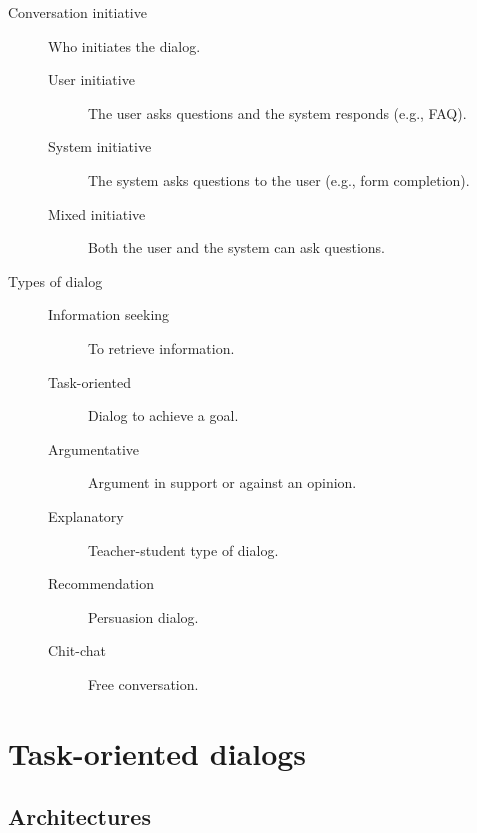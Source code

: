 \begin{description}
    \item[Conversation initiative] 
        Who initiates the dialog.

        \begin{description}
            \item[User initiative]
                The user asks questions and the system responds (e.g., FAQ).

            \item[System initiative]
                The system asks questions to the user (e.g., form completion).

            \item[Mixed initiative]
                Both the user and the system can ask questions.
        \end{description}

    \item[Types of dialog] 
        \phantom{}
        \begin{description}
            \item[Information seeking] To retrieve information.
            \item[Task-oriented] Dialog to achieve a goal.
            \item[Argumentative] Argument in support or against an opinion.
            \item[Explanatory] Teacher-student type of dialog. 
            \item[Recommendation] Persuasion dialog.
            \item[Chit-chat] Free conversation. 
        \end{description}
\end{description}



\section{Task-oriented dialogs}


\subsection{Architectures}

